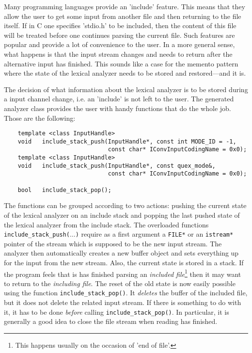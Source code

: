 Many programming languages provide an 'include' feature. This means that they
allow the user to get some input from another file and then returning to the
file itself. If in C one specifies 'stdio.h' to be included, then the content
of this file will be treated before one continues parsing the current file.
Such features are popular and provide a lot of convenience to the user. In a
more general sense, what happens is that the input stream changes and needs to
return after the alternative input has finished. This sounds like a case for
the memento pattern \cite{} where the state of the lexical analyzer needs to be
stored and restored---and it is.

The decision of what information about the lexical analyzer is to be stored
during a input channel change, i.e. an 'include' is not left to the user. The
generated analyzer class provides the user with handy functions that do the
whole job. Those are the following:

\begin{lstlisting}
	template <class InputHandle> 
	void   include_stack_push(InputHandle*, const int MODE_ID = -1, 
                              const char* IConvInputCodingName = 0x0);
	template <class InputHandle> 
	void   include_stack_push(InputHandle*, const quex_mode&,
                              const char* IConvInputCodingName = 0x0);

	bool   include_stack_pop();
\end{lstlisting}

The functions can be grouped according to two actions: pushing the current state
of the lexical analyzer on an include stack and popping the last pushed state
of the lexical analyzer from the include stack. The overloaded functions
{\tt include_stack_push($\ldots$)} require as a first argument a {\tt FILE*}
or an {\tt istream*} pointer of the stream which is supposed to be the new
input stream. The analyzer then automatically creates a new buffer object and
sets everything up for the input from the new stream. Also, the current
state is stored in a stack. If the program feels that is has finished parsing 
an {\it included file}\footnote{This happens usually on the occasion of 'end of file'.}
then it may want to return to the {\it including file}. The reset of the old 
state is now easily possible using the function {\tt include_stack_pop()}. 
It {\it deletes} the buffer of the included file, but it does not delete
the related input stream. If there is something to do with it, it has to be done
{\it before} calling {\tt include_stack_pop()}. In particular, it 
is generally a good idea to close the file stream when reading has finished.
